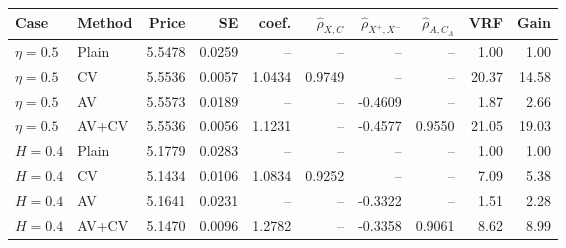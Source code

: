 \begin{tabular}{llrrrrrrrr}
\toprule
Case & Method & Price & SE & coef. & $\widehat\rho_{X,C}$ & $\widehat\rho_{X^+,X^-}$ & $\widehat\rho_{A,C_A}$ & VRF & Gain \\
\midrule
$\eta=0.5$ & Plain & 5.5478 & 0.0259 & -- & -- & -- & -- & 1.00 & 1.00 \\
$\eta=0.5$ & CV & 5.5536 & 0.0057 & 1.0434 & 0.9749 & -- & -- & 20.37 & 14.58 \\
$\eta=0.5$ & AV & 5.5573 & 0.0189 & -- & -- & -0.4609 & -- & 1.87 & 2.66 \\
$\eta=0.5$ & AV+CV & 5.5536 & 0.0056 & 1.1231 & -- & -0.4577 & 0.9550 & 21.05 & 19.03 \\
\midrule
$H=0.4$ & Plain & 5.1779 & 0.0283 & -- & -- & -- & -- & 1.00 & 1.00 \\
$H=0.4$ & CV & 5.1434 & 0.0106 & 1.0834 & 0.9252 & -- & -- & 7.09 & 5.38 \\
$H=0.4$ & AV & 5.1641 & 0.0231 & -- & -- & -0.3322 & -- & 1.51 & 2.28 \\
$H=0.4$ & AV+CV & 5.1470 & 0.0096 & 1.2782 & -- & -0.3358 & 0.9061 & 8.62 & 8.99 \\
\bottomrule
\end{tabular}
